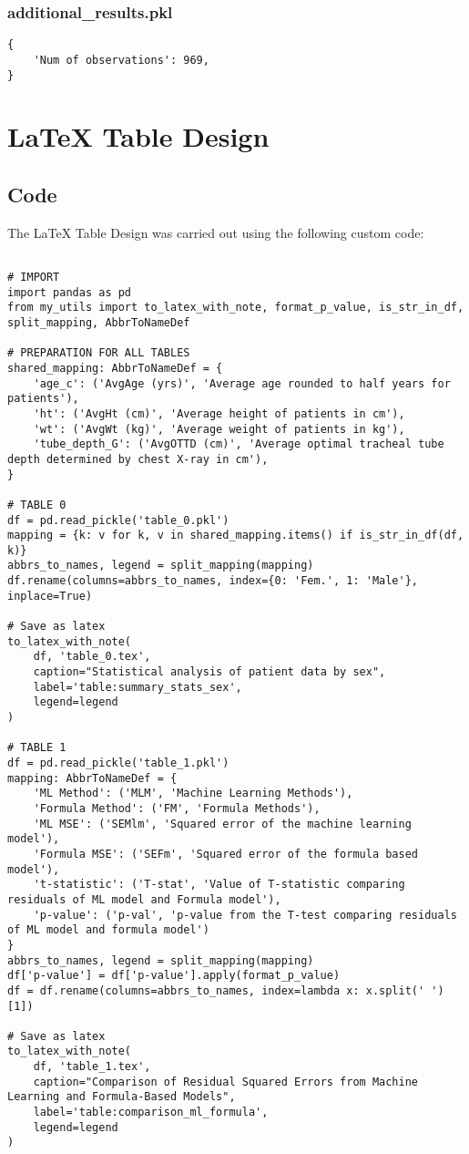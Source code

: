 \documentclass[11pt]{article}
\begin{document}
\subsubsection*{additional\_results.pkl}

\begin{Verbatim}[tabsize=4]
{
    'Num of observations': 969,
}
\end{Verbatim}

\section{LaTeX Table Design}
\subsection{{Code}}
The LaTeX Table Design was carried out using the following custom code:

\begin{verbatim}

# IMPORT
import pandas as pd
from my_utils import to_latex_with_note, format_p_value, is_str_in_df, split_mapping, AbbrToNameDef

# PREPARATION FOR ALL TABLES
shared_mapping: AbbrToNameDef = {
    'age_c': ('AvgAge (yrs)', 'Average age rounded to half years for patients'),
    'ht': ('AvgHt (cm)', 'Average height of patients in cm'),
    'wt': ('AvgWt (kg)', 'Average weight of patients in kg'),
    'tube_depth_G': ('AvgOTTD (cm)', 'Average optimal tracheal tube depth determined by chest X-ray in cm'),
}

# TABLE 0
df = pd.read_pickle('table_0.pkl')
mapping = {k: v for k, v in shared_mapping.items() if is_str_in_df(df, k)}
abbrs_to_names, legend = split_mapping(mapping)
df.rename(columns=abbrs_to_names, index={0: 'Fem.', 1: 'Male'}, inplace=True)

# Save as latex
to_latex_with_note(
    df, 'table_0.tex',
    caption="Statistical analysis of patient data by sex",
    label='table:summary_stats_sex',
    legend=legend
)

# TABLE 1
df = pd.read_pickle('table_1.pkl')
mapping: AbbrToNameDef = {
    'ML Method': ('MLM', 'Machine Learning Methods'),
    'Formula Method': ('FM', 'Formula Methods'),
    'ML MSE': ('SEMlm', 'Squared error of the machine learning model'),
    'Formula MSE': ('SEFm', 'Squared error of the formula based model'),
    't-statistic': ('T-stat', 'Value of T-statistic comparing residuals of ML model and Formula model'),
    'p-value': ('p-val', 'p-value from the T-test comparing residuals of ML model and formula model')
}
abbrs_to_names, legend = split_mapping(mapping)
df['p-value'] = df['p-value'].apply(format_p_value)
df = df.rename(columns=abbrs_to_names, index=lambda x: x.split(' ')[1])

# Save as latex
to_latex_with_note(
    df, 'table_1.tex',
    caption="Comparison of Residual Squared Errors from Machine Learning and Formula-Based Models",
    label='table:comparison_ml_formula',
    legend=legend
)

\end{verbatim}
\end{document}
